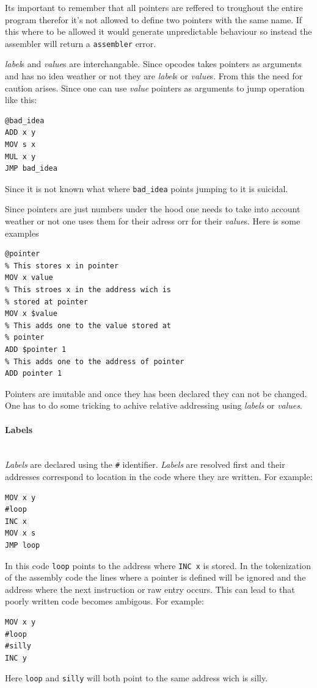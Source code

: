 \documentclass{article}
\newcommand{\V}{\verb}
\begin{document}
Its important to remember that all pointers are reffered to troughout the entire
program therefor it's not allowed to define two pointers with the same name. If
this where to be allowed it would generate unpredictable behaviour so instead
the assembler will return a \V+assembler+ error.

\emph{label}s and \emph{value}s are interchangable. Since opcodes takes pointers as arguments
and has no idea weather or not they are \emph{label}s or \emph{value}s. From this the need for
caution arises. Since one can use \emph{value} pointers as arguments to jump operation
like this:
\begin{verbatim}
@bad_idea
ADD x y
MOV s x
MUL x y
JMP bad_idea
\end{verbatim}
Since it is not known what where \V+bad_idea+ points jumping to it is suicidal.

Since pointers are just numbers under the hood one needs to take into account
weather or not one uses them for their adress orr for their \emph{value}s. Here is some
examples
\begin{verbatim}
@pointer
% This stores x in pointer
MOV x value
% This stroes x in the address wich is
% stored at pointer
MOV x $value
% This adds one to the value stored at 
% pointer
ADD $pointer 1
% This adds one to the address of pointer
ADD pointer 1
\end{verbatim}

Pointers are imutable and once they has been declared they can not be changed.
One has to do some tricking to achive relative addressing using \emph{labels} or
\emph{values}.


\paragraph{Labels} \
\\
\emph{Labels} are declared using the \V+#+ identifier.
\emph{Labels} are resolved first and their addresses
correspond to location in the code where they are written. For example:
\begin{verbatim}
MOV x y
#loop
INC x
MOV x s
JMP loop
\end{verbatim}
In this code \V+loop+ points to the address where \V+INC x+ is stored. In the
tokenization of the assembly code the lines where a pointer is defined will be
ignored and the address where the next instruction or raw entry occurs. This can
lead to that poorly written code becomes ambigous. For example:
\begin{verbatim}
MOV x y
#loop
#silly
INC y
\end{verbatim}
Here \V+loop+ and \V+silly+ will both point to the same address wich is silly.
\end{document}
